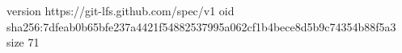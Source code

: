 version https://git-lfs.github.com/spec/v1
oid sha256:7dfeab0b65bfe237a4421f54882537995a062cf1b4bece8d5b9c74354b88f5a3
size 71
